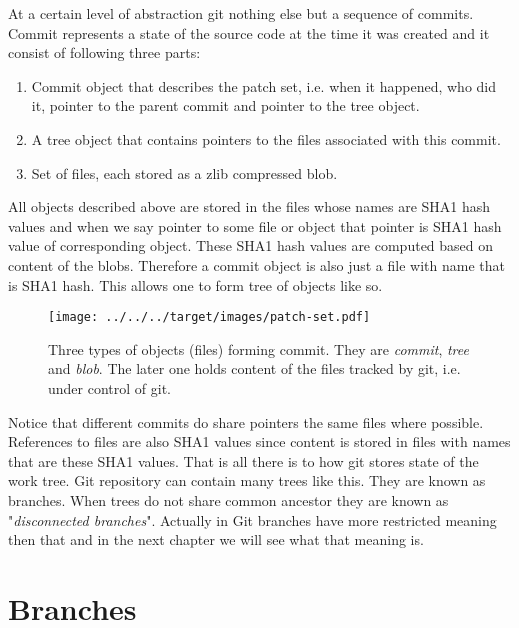 \documentclass{article}
\theoremstyle{definition}
\begin{document}
        At a certain level of abstraction git nothing else but a sequence of commits. Commit represents a state of the
        source code at the time it was created and it consist of following three parts:
        \begin{enumerate}
            \item Commit object that describes the patch set, i.e. when it happened, who did it, pointer to the parent commit and pointer to the tree object.
            \item A tree object that contains pointers to the files associated with this commit.
            \item Set of files, each stored as a zlib compressed blob.
        \end{enumerate}
        All objects described above are stored in the files whose names are SHA1 hash values and when we say pointer to some
        file or object that pointer is SHA1 hash value of corresponding object. These SHA1 hash values are computed based
        on content of the blobs. Therefore a commit object is also just a file with name that is SHA1 hash. This allows one
        to form tree of objects like so.

        \begin{figure}[h]
        \centering
        \texttt{[image: ../../../target/images/patch-set.pdf]}
        \label{fig:patch-set}
        \caption{Three types of objects (files) forming commit. They are {\em commit}, {\em tree} and {\em blob}. The later
          one holds content of the files tracked by git, i.e. under control of git.}
        \end{figure}

        \noindent Notice that different commits do share pointers the same files where possible. References to files are
        also SHA1 values since content is stored in files with names that are these SHA1 values. That is all there is to how
        git stores state of the work tree. Git repository can contain many trees like this. They are known as branches. When
        trees do not share common ancestor they are known as "{\em disconnected branches}". Actually in Git branches have
        more restricted meaning then that and in the next chapter we will see what that meaning is.

        \section{Branches}
\end{document}
